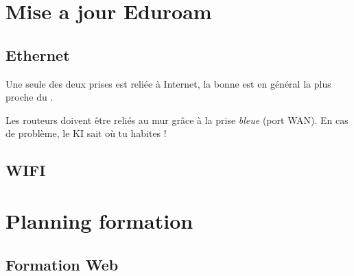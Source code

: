 \documentclass{ki019}
\begin{document}
\section{Mise a jour Eduroam}

\subsection{Ethernet}

\Footer
\lipsum[1-2]

\begin{kiframe}
    Une seule des deux prises  est reliée à Internet, la bonne est en général la plus proche du .

    Les routeurs doivent être reliés au mur grâce à la prise \emph{bleue} (port WAN). En cas de problème, le KI sait où tu habites !
\end{kiframe}

\lipsum[1]

\subsection{WIFI}

\lipsum[1]

\section{Planning formation}

\subsection{Formation Web}

\Footer
\lipsum[1-3]
\end{document}

